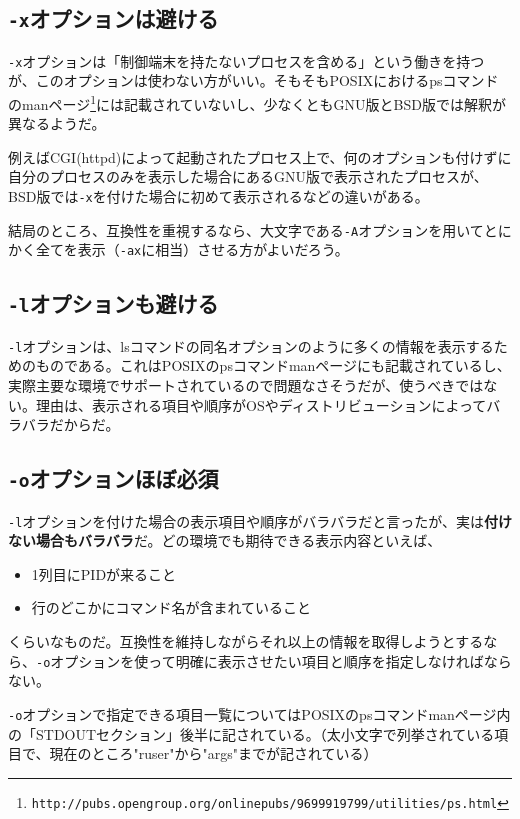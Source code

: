 \subsection*{\verb|-x|オプションは避ける}

\verb|-x|オプションは「制御端末を持たないプロセスを含める」という働きを持つが、このオプションは使わない方がいい。そもそもPOSIXにおけるpsコマンドのmanページ\footnote{\verb|http://pubs.opengroup.org/onlinepubs/9699919799/utilities/ps.html|}には記載されていないし、少なくともGNU版とBSD版では解釈が異なるようだ。

例えばCGI(httpd)によって起動されたプロセス上で、何のオプションも付けずに自分のプロセスのみを表示した場合にあるGNU版で表示されたプロセスが、BSD版では\verb|-x|を付けた場合に初めて表示されるなどの違いがある。

結局のところ、互換性を重視するなら、大文字である\verb|-A|オプションを用いてとにかく全てを表示（\verb|-ax|に相当）させる方がよいだろう。

\subsection*{\verb|-l|オプションも避ける}

\verb|-l|オプションは、lsコマンドの同名オプションのように多くの情報を表示するためのものである。これはPOSIXのpsコマンドmanページにも記載されているし、実際主要な環境でサポートされているので問題なさそうだが、使うべきではない。理由は、表示される項目や順序がOSやディストリビューションによってバラバラだからだ。

\subsection*{\verb|-o|オプションほぼ必須}

\verb|-l|オプションを付けた場合の表示項目や順序がバラバラだと言ったが、実は\textbf{付けない場合もバラバラ}だ。どの環境でも期待できる表示内容といえば、

\begin{itemize}
  \item 1列目にPIDが来ること
  \item 行のどこかにコマンド名が含まれていること
\end{itemize}

\noindent
くらいなものだ。互換性を維持しながらそれ以上の情報を取得しようとするなら、\verb|-o|オプションを使って明確に表示させたい項目と順序を指定しなければならない。

\verb|-o|オプションで指定できる項目一覧についてはPOSIXのpsコマンドmanページ内の「STDOUTセクション」後半に記されている。（太小文字で列挙されている項目で、現在のところ"ruser"から"args"までが記されている）

